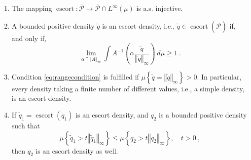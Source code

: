 \documentclass[graybox]{svmult}
\newcommand{\escortof}[1]{\operatorname{escort}\left(#1\right)}
\newcommand{\normat}[2]{\left\Vert#2\right\Vert_{#1}}
\newcommand{\set}[1]{\left\{#1\right\}}
\begin{document}
\begin{proposition}\label{prop:XCM}
  \begin{enumerate}
   \item\label{item:XCM1}
 The mapping $\operatorname{escort} \colon \overline{\mathcal P}\rightarrow  \overline{\mathcal P}\cap L^{\infty}(\mu)$ is a.s. injective. 
    \item\label{item:XCM2}
A bounded positive density $\widetilde q$ is an escort density, i.e., $\widetilde q\in\escortof {\overline{\mathcal P}}$ if, and only if,
\begin{equation}\label{eq:rangecondition}
 \lim_{\alpha \uparrow \normat \infty {A}} \int A^{-1}\left(\alpha \frac{\widetilde q}{\normat \infty {\widetilde q}}\right)\ d\mu \ge 1 \ .
\end{equation}
\item \label{item:XCM3}
Condition \eqref{eq:rangecondition} is fulfilled if $\mu\set{\widetilde q = \normat \infty {\widetilde q}} > 0$. In particular, every density taking a finite number of different values, i.e., a simple density, is an escort density.
\item\label{item:XCM4} If $\widetilde q_1 = \escortof {q_1}$ is an escort density, and $q_2$ is a bounded positive density such that
  \begin{equation*}
    \mu\set{\widetilde q_1 > t \normat \infty {\widetilde q_1}} \leq \mu\set{q_2 > t \normat \infty {q_2}}, \quad t > 0 \ , 
  \end{equation*}
then $q_2$ is an escort density as well.
\end{enumerate}
\end{proposition}
%
\end{document}
